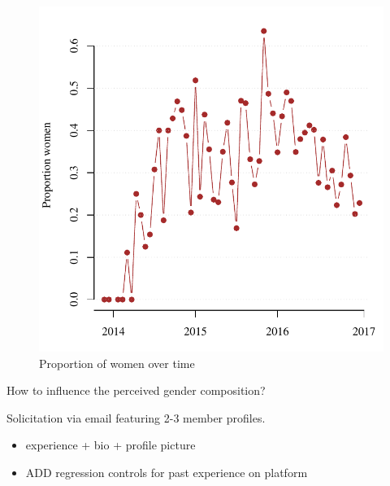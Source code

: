 \begin{frame}

\begin{figure}
\centering
\includegraphics{../Descriptives/desc_files/figure-latex/overtime-1.pdf}
\caption{Proportion of women over time}
\end{figure}

\end{frame}

\begin{frame}{How to influence the perceived gender composition?}

Solicitation via email featuring 2-3 member profiles.

\begin{itemize}
\item
  experience + bio + profile picture
\item
  ADD regression controls for past experience on platform
\end{itemize}

\end{frame}

